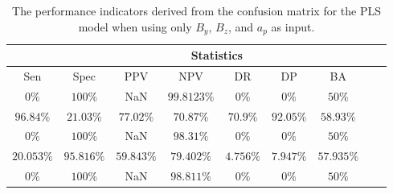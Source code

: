 \begin{table}[!ht]
	\centering
	\begin{tabular}{|c|c|c|c|c|c|c|c|c|}
		\hline
		 & \multicolumn{7}{c|}{Statistics} \\ \hline
		Sen & Spec & PPV & NPV & DR & DP & BA \\ \hline
		$0\%$ & $100\%$ & NaN & $99.8123\%$ & $0\%$ & $0\%$ & $50\%$ \\ \hline
		$96.84\%$ & $21.03\%$ & $77.02\%$ & $70.87\%$ & $70.9\%$ & $92.05\%$ & $58.93\%$ \\ \hline
		$0\%$ & $100\%$ & NaN & $98.31\%$ & $0\%$ & $0\%$ & $50\%$ \\ \hline
		$20.053\%$ & $95.816\%$ & $59.843\%$ & $79.402\%$ & $4.756\%$ & $7.947\%$ & $57.935\%$ \\ \hline
		$0\%$ & $100\%$ & NaN & $98.811\%$ & $0\%$ & $0\%$ & $50\%$ \\ \hline
	\end{tabular}
	\caption{The performance indicators derived from the confusion matrix for the PLS model when using only $B_{y}$, $B_{z}$, and $a_{p}$ as input.}
	\label{tab:cs:yzap:pls}
\end{table}
